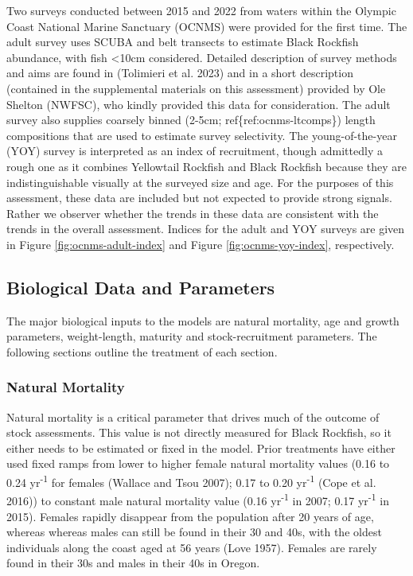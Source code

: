 \documentclass[11pt,
  english,
  letterpaper,
]{article}
\begin{document}
Two surveys conducted between 2015 and 2022 from waters within the Olympic Coast National Marine Sanctuary (OCNMS) were provided for the first time. The adult survey uses SCUBA and belt transects to estimate Black Rockfish abundance, with fish \textless10cm considered. Detailed description of survey methods and aims are found in (Tolimieri et al. 2023) and in a short description (contained in the supplemental materials on this assessment) provided by Ole Shelton (NWFSC), who kindly provided this data for consideration. The adult survey also supplies coarsely binned (2-5cm; ref\{ref:ocnms-ltcomps\}) length compositions that are used to estimate survey selectivity. The young-of-the-year (YOY) survey is interpreted as an index of recruitment, though admittedly a rough one as it combines Yellowtail Rockfish and Black Rockfish because they are indistinguishable visually at the surveyed size and age. For the purposes of this assessment, these data are included but not expected to provide strong signals. Rather we observer whether the trends in these data are consistent with the trends in the overall assessment. Indices for the adult and YOY surveys are given in Figure \ref{fig:ocnms-adult-index} and Figure \ref{fig:ocnms-yoy-index}, respectively.

\hypertarget{biological-data-and-parameters}{%
\subsection{Biological Data and Parameters}\label{biological-data-and-parameters}}

The major biological inputs to the models are natural mortality, age and growth parameters, weight-length, maturity and stock-recruitment parameters. The following sections outline the treatment of each section.

\hypertarget{natural-mortality}{%
\subsubsection{Natural Mortality}\label{natural-mortality}}

Natural mortality is a critical parameter that drives much of the outcome of stock assessments. This value is not directly measured for Black Rockfish, so it either needs to be estimated or fixed in the model. Prior treatments have either used fixed ramps from lower to higher female natural mortality values (0.16 to 0.24 yr\textsuperscript{-1} for females (Wallace and Tsou 2007); 0.17 to 0.20 yr\textsuperscript{-1} (Cope et al. 2016)) to constant male natural mortality value (0.16 yr\textsuperscript{-1} in 2007; 0.17 yr\textsuperscript{-1} in 2015). Females rapidly disappear from the population after 20 years of age, whereas whereas males can still be found in their 30 and 40s, with the oldest individuals along the coast aged at 56 years (Love 1957). Females are rarely found in their 30s and males in their 40s in Oregon.
\end{document}
